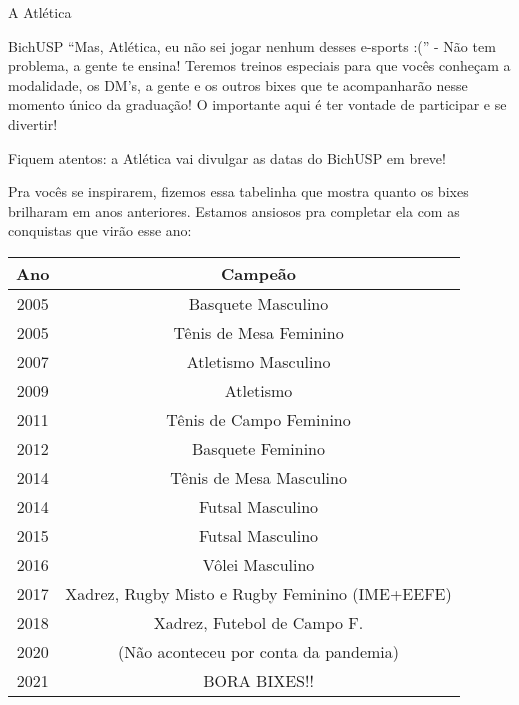 \begin{secao}{A Atlética}
\begin{subsecao}{BichUSP}
``Mas, Atlética, eu não sei jogar nenhum desses e-sports :('' - Não tem
problema, a gente te ensina! Teremos treinos especiais para que vocês conheçam
a modalidade, os DM’s, a gente e os outros bixes que te
acompanharão nesse momento único da graduação! O importante aqui é ter vontade
de participar e se divertir!

Fiquem atentos: a Atlética vai divulgar as datas do BichUSP em breve!



Pra vocês se inspirarem, fizemos essa tabelinha que mostra quanto os bixes
brilharam em anos anteriores. Estamos ansiosos pra completar ela com as
conquistas que virão esse ano:

\begin{center}
  \begin{tabular}{c|c}
    \hline
    Ano & Campeão\\
    \hline
    2005 & Basquete Masculino \\
    2005 & Tênis de Mesa Feminino \\
    2007 & Atletismo Masculino\\
    2009 & Atletismo\\
    2011 & Tênis de Campo Feminino\\
    2012 & Basquete Feminino\\
    2014 & Tênis de Mesa Masculino\\
    2014 & Futsal Masculino\\
    2015 & Futsal Masculino\\
    2016 & Vôlei Masculino\\
    2017 & Xadrez, Rugby Misto e Rugby Feminino (IME+EEFE)\\
    2018 & Xadrez, Futebol de Campo F.\\
    2020 & (Não aconteceu por conta da pandemia)\\
    2021 & BORA BIXES!!
    \hline
  \end{tabular}
\end{center}


\end{subsecao}
\end{secao}
